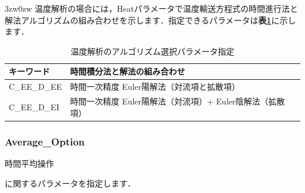 \begin{indentation}{3zw}{0zw}
温度解析の場合には，Heatパラメータで温度輸送方程式の時間進行法と解法アルゴリズムの組み合わせを示します．指定できるパラメータは\textbf{表\ref{tbl:alg_heat}}に示します．\\

\begin{table}[htdp]
\caption{温度解析のアルゴリズム選択パラメータ指定}
\begin{center}
\small
\begin{tabular}{ll} \toprule
キーワード & 時間積分法と解法の組み合わせ\\ \midrule
C\_EE\_D\_EE & 時間一次精度 Euler陽解法（対流項と拡散項）\\
C\_EE\_D\_EI & 時間一次精度 Euler陽解法（対流項）+ Euler陰解法（拡散項）\\ \bottomrule
\end{tabular}
\end{center}
\label{tbl:alg_heat}
\end{table}
\end{indentation}



\pagebreak
\subsubsection{Average\_Option}

\hypertarget{tgt:average_option}{時間平均操作}に関するパラメータを指定します．

